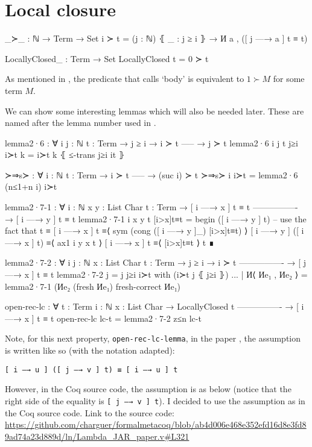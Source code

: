 \section{Local closure}
\label{appendix:local_closure_proofs}
\begin{code}
  _≻_ : ℕ → Term → Set
  i ≻ t = (j : ℕ) ⦃ _ : j ≥ i ⦄ → И a , ([ j —→ a ] t ≡ t)

  LocallyClosed_ : Term → Set
  LocallyClosed t = 0 ≻ t
\end{code}

As mentioned in \citet{pitts_locally_2023}, the predicate that \citet{chargueraud_locally_2012}
calls `body' is equivalent to $1 \succ M$ for some term $M$.

We can show some interesting lemmas which will also be needed later. These are named after the lemma
number used in \citet{pitts_locally_2023}.
\begin{code}
  lemma2·6 : ∀ {i j : ℕ} {t : Term}
    → j ≥ i
    → i ≻ t
      -----
    → j ≻ t
  lemma2·6 {i} {j} {t} j≥i i≻t k = i≻t k ⦃ ≤-trans j≥i it ⦄

  ≻⇒s≻ : ∀ {i : ℕ} {t : Term}
    → i ≻ t
      -----
    → (suc i) ≻ t
  ≻⇒s≻ {i} i≻t = lemma2·6 (n≤1+n i) i≻t

  lemma2·7-1 : ∀ {i : ℕ} {x y : List Char} {t : Term}
    → [ i —→ x ] t ≡ t
      ----------------
    → [ i —→ y ] t ≡ t
  lemma2·7-1 {i} {x} {y} {t} [i>x]t≡t =
    begin
      ([ i —→ y ] t)
    -- use the fact that t ≡ [ i —→ x ] t
    ≡⟨ sym (cong ([ i —→ y ]_) [i>x]t≡t) ⟩
      [ i —→ y ] ([ i —→ x ] t)
    ≡⟨ ax1 i y x t ⟩
      [ i —→ x ] t
    ≡⟨ [i>x]t≡t ⟩
      t
    ∎

  lemma2·7-2 : ∀ {i j : ℕ} {x : List Char} {t : Term}
    → j ≥ i
    → i ≻ t
      ----------------
    → [ j —→ x ] t ≡ t
  lemma2·7-2 {j = j} j≥i i≻t with (i≻t j ⦃ j≥i ⦄)
  ... | И⟨ Иe₁ , Иe₂ ⟩ =
    lemma2·7-1 (Иe₂ (fresh Иe₁) {fresh-correct Иe₁})

  open-rec-lc : ∀ {t : Term} {i : ℕ} {x : List Char}
    → LocallyClosed t
      ----------------
    → [ i —→ x ] t ≡ t
  open-rec-lc lc-t = lemma2·7-2 z≤n lc-t
\end{code}

Note, for this next property, \texttt{open-rec-lc-lemma}, in the paper
\citep{chargueraud_locally_2012}, the assumption is written like so (with the notation adapted):

\texttt{[ i —→ u ] ([ j —→ v ] t) ≡ [ i —→ u ] t}

However, in the Coq source code, the assumption is as below (notice that the right side of the
equality is \texttt{[ j —→ v ] t}). I decided to use the assumption as in the Coq source code. Link
to the source code:
\url{https://github.com/charguer/formalmetacoq/blob/ab4d006e468e352efd16d8e3fd89ad74a23d889d/ln/Lambda_JAR_paper.v#L321}

